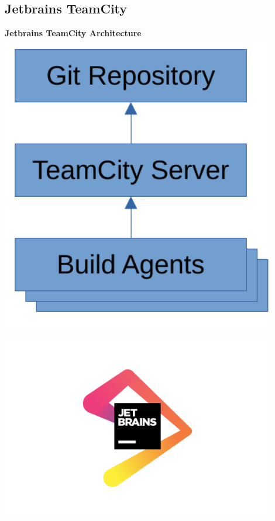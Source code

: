 \documentclass[english,11pt]{beamer}
\begin{document}
\begin{frame}

\section{Jetbrains TeamCity}
\begin{minipage}{0.45\textwidth}

\textbf{Jetbrains TeamCity Architecture}
        \centering
        \includegraphics[width=0.9\textwidth]{diagrams/teamcity.pdf} %
    \end{minipage}\hfill
    \begin{minipage}{0.45\textwidth}
        \centering
        \includegraphics[width=0.9\textwidth]{logos/jetbrains.pdf}

\end{minipage}
\end{frame}
\end{document}
